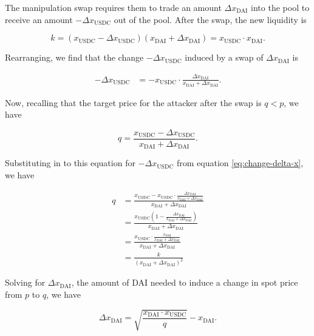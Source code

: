 \documentclass[a4paper, 11pt]{article}
\begin{document}
The manipulation swap requires them to trade an amount $\Delta x_{\text{DAI}}$ into the pool to receive an amount $-\Delta x_{\text{USDC}}$ out of the pool. After the swap, the new liquidity is

\begin{equation}
k = (x_{\text{USDC}} - \Delta x_{\text{USDC}}) (x_{\text{DAI}} + \Delta x_{\text{DAI}}) = x_{\text{USDC}} \cdot x_{\text{DAI}}.
\end{equation}

Rearranging, we find that the change $-\Delta x_{\text{USDC}}$ induced by a swap of $\Delta x_{\text{DAI}}$ is 

\begin{align}
\label{eq:change-delta-x}
-\Delta x_{\text{USDC}} 
&= 
-x_{\text{USDC}} \cdot \frac{\Delta x_{\text{DAI}}}{x_{\text{DAI}} + \Delta x_{\text{DAI}}}.
\end{align}

Now, recalling that the target price for the attacker after the swap is $q < p$, we have

\begin{equation}
q
=
\frac{x_{\text{USDC}} - \Delta x_{\text{USDC}}}{x_{\text{DAI}} + \Delta x_{\text{DAI}}}.
\end{equation}

Substituting in to this equation for $-\Delta x_{\text{USDC}}$ from equation \eqref{eq:change-delta-x}, we have

\begin{align}
q
&=
\frac{x_{\text{USDC}} -x_{\text{USDC}} \cdot \frac{\Delta x_{\text{DAI}}}{x_{\text{DAI}} + \Delta x_{\text{DAI}}}}{x_{\text{DAI}} + \Delta x_{\text{DAI}}} \\ \nonumber
&=
\frac{x_{\text{USDC}} \left(1 - \frac{\Delta x_{\text{DAI}}}{x_{\text{DAI}} + \Delta x_{\text{DAI}}} \right)}{x_{\text{DAI}} + \Delta x_{\text{DAI}}} \\ \nonumber
&=
\frac{x_{\text{USDC}} \cdot \frac{x_{\text{DAI}}}{x_{\text{DAI}} + \Delta x_{\text{DAI}}} }{x_{\text{DAI}} + \Delta x_{\text{DAI}}} \\ \nonumber
&=
\frac{k}{(x_{\text{DAI}} + \Delta x_{\text{DAI}})^2}
\end{align}

Solving for $\Delta x_{\text{DAI}}$, the amount of DAI needed to induce a change in spot price from $p$ to $q$, we have

\begin{equation}
\label{eq:delta-x-manipulated}
\Delta x_{\text{DAI}}
=
\sqrt{\frac{x_{\text{DAI}} \cdot x_{\text{USDC}}}{q}} - x_{\text{DAI}}.
\end{equation}
\end{document}
